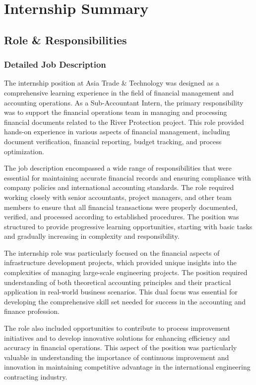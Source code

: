 
\chapter{Internship Summary}

\section{Role \& Responsibilities}

\subsection{Detailed Job Description}
The internship position at Asia Trade \& Technology was designed as a comprehensive learning experience in the field of financial management and accounting operations. As a Sub-Accountant Intern, the primary responsibility was to support the financial operations team in managing and processing financial documents related to the River Protection project. This role provided hands-on experience in various aspects of financial management, including document verification, financial reporting, budget tracking, and process optimization.

The job description encompassed a wide range of responsibilities that were essential for maintaining accurate financial records and ensuring compliance with company policies and international accounting standards. The role required working closely with senior accountants, project managers, and other team members to ensure that all financial transactions were properly documented, verified, and processed according to established procedures. The position was structured to provide progressive learning opportunities, starting with basic tasks and gradually increasing in complexity and responsibility.

The internship role was particularly focused on the financial aspects of infrastructure development projects, which provided unique insights into the complexities of managing large-scale engineering projects. The position required understanding of both theoretical accounting principles and their practical application in real-world business scenarios. This dual focus was essential for developing the comprehensive skill set needed for success in the accounting and finance profession.

The role also included opportunities to contribute to process improvement initiatives and to develop innovative solutions for enhancing efficiency and accuracy in financial operations. This aspect of the position was particularly valuable in understanding the importance of continuous improvement and innovation in maintaining competitive advantage in the international engineering contracting industry.

